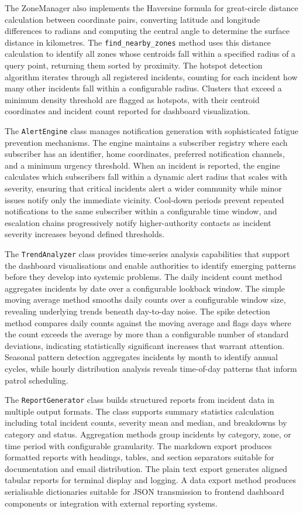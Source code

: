 \documentclass[conference]{IEEEtran}
\begin{document}
The ZoneManager also implements the Haversine formula for great-circle distance calculation between coordinate pairs, converting latitude and longitude differences to radians and computing the central angle to determine the surface distance in kilometres. The \texttt{find\_nearby\_zones} method uses this distance calculation to identify all zones whose centroids fall within a specified radius of a query point, returning them sorted by proximity. The hotspot detection algorithm iterates through all registered incidents, counting for each incident how many other incidents fall within a configurable radius. Clusters that exceed a minimum density threshold are flagged as hotspots, with their centroid coordinates and incident count reported for dashboard visualization.

The \texttt{AlertEngine} class manages notification generation with sophisticated fatigue prevention mechanisms. The engine maintains a subscriber registry where each subscriber has an identifier, home coordinates, preferred notification channels, and a minimum urgency threshold. When an incident is reported, the engine calculates which subscribers fall within a dynamic alert radius that scales with severity, ensuring that critical incidents alert a wider community while minor issues notify only the immediate vicinity. Cool-down periods prevent repeated notifications to the same subscriber within a configurable time window, and escalation chains progressively notify higher-authority contacts as incident severity increases beyond defined thresholds.

The \texttt{TrendAnalyzer} class provides time-series analysis capabilities that support the dashboard visualisations and enable authorities to identify emerging patterns before they develop into systemic problems. The daily incident count method aggregates incidents by date over a configurable lookback window. The simple moving average method smooths daily counts over a configurable window size, revealing underlying trends beneath day-to-day noise. The spike detection method compares daily counts against the moving average and flags days where the count exceeds the average by more than a configurable number of standard deviations, indicating statistically significant increases that warrant attention. Seasonal pattern detection aggregates incidents by month to identify annual cycles, while hourly distribution analysis reveals time-of-day patterns that inform patrol scheduling.

The \texttt{ReportGenerator} class builds structured reports from incident data in multiple output formats. The class supports summary statistics calculation including total incident counts, severity mean and median, and breakdowns by category and status. Aggregation methods group incidents by category, zone, or time period with configurable granularity. The markdown export produces formatted reports with headings, tables, and section separators suitable for documentation and email distribution. The plain text export generates aligned tabular reports for terminal display and logging. A data export method produces serialisable dictionaries suitable for JSON transmission to frontend dashboard components or integration with external reporting systems.
\end{document}
